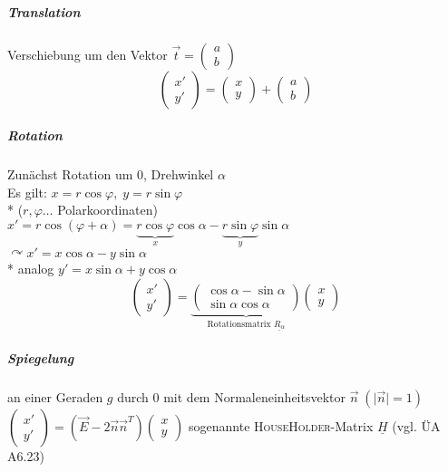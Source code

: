 \documentclass[a4paper]{scrartcl}
\begin{document}
\subparagraph{Translation} Verschiebung um den Vektor $\vec{t} = \begin{pmatrix}a \\b\end{pmatrix}$\\
\begin{equation}\label{Translation}
\begin{pmatrix} x' \\ y' \end{pmatrix} = \begin{pmatrix} x \\y \end{pmatrix} + \begin{pmatrix} a \\ b \end{pmatrix} 
\end{equation}

\subparagraph{Rotation} Zunächst Rotation um $0$, Drehwinkel $\alpha$\\
Es gilt: $x=r\cos{\varphi}, \; y=r \sin{\varphi}$\\*
($r,\varphi \dots$ Polarkoordinaten)\\
$x' = r \cos{(\varphi + \alpha)} = \underbrace{ r \cos{\varphi}}_{x} \cos{\alpha} - \underbrace{r \sin{\varphi}}_{y} \sin{\alpha}$\\
$\curvearrowright x' = x \cos{\alpha} - y \sin{\alpha}$\\*
analog $y' = x \sin{\alpha} + y \cos{\alpha}$\\
\[\begin{pmatrix} x' \\y'\end{pmatrix} = \underbrace{\begin{pmatrix} \cos{\alpha} - \sin{\alpha} \\ \sin{\alpha} \cos{\alpha} \end{pmatrix}}_{\text{Rotationsmatrix } \underline{R_{\alpha}}} \begin{pmatrix} x \\ y \end{pmatrix}\]

\subparagraph{Spiegelung} an einer Geraden $g$ durch $0$ mit dem Normaleneinheitsvektor $\vec{n} \; (\lvert \vec{n} \rvert = 1 )$\\
$\begin{pmatrix} x' \\ y' \end{pmatrix} = (\vec{E} - 2 \vec{n} \vec{n}^T ) \begin{pmatrix} x \\y \end{pmatrix}$ sogenannte \textsc{HouseHolder}-Matrix $\underline{H}$ (vgl. ÜA A6.23)
\end{document}
